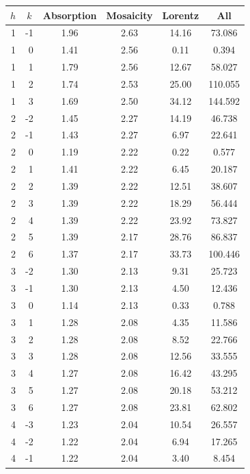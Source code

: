 \begin{table}[htbp]
  \centering
    \begin{tabular}{rrcccc}
    \hline
    \multicolumn{1}{c}{$h$} & \multicolumn{1}{c}{$k$} & \multicolumn{1}{c}{Absorption} & \multicolumn{1}{c}{Mosaicity} & \multicolumn{1}{c}{Lorentz} & \multicolumn{1}{c}{All} \\
    \hline    
    1  & -1 & 1.96 & 2.63 & 14.16 & 73.086  \\
    1  & 0  & 1.41 & 2.56 & 0.11  & 0.394   \\
    1  & 1  & 1.79 & 2.56 & 12.67 & 58.027  \\
    1  & 2  & 1.74 & 2.53 & 25.00 & 110.055 \\
    1  & 3  & 1.69 & 2.50 & 34.12 & 144.592 \\
    2  & -2 & 1.45 & 2.27 & 14.19 & 46.738  \\
    2  & -1 & 1.43 & 2.27 & 6.97  & 22.641  \\
    2  & 0  & 1.19 & 2.22 & 0.22  & 0.577   \\
    2  & 1  & 1.41 & 2.22 & 6.45  & 20.187  \\
    2  & 2  & 1.39 & 2.22 & 12.51 & 38.607  \\
    2  & 3  & 1.39 & 2.22 & 18.29 & 56.444  \\
    2  & 4  & 1.39 & 2.22 & 23.92 & 73.827  \\
    2  & 5  & 1.39 & 2.17 & 28.76 & 86.837  \\
    2  & 6  & 1.37 & 2.17 & 33.73 & 100.446 \\
    3  & -2 & 1.30 & 2.13 & 9.31  & 25.723  \\
    3  & -1 & 1.30 & 2.13 & 4.50  & 12.436  \\
    3  & 0  & 1.14 & 2.13 & 0.33  & 0.788   \\
    3  & 1  & 1.28 & 2.08 & 4.35  & 11.586  \\
    3  & 2  & 1.28 & 2.08 & 8.52  & 22.766  \\
    3  & 3  & 1.28 & 2.08 & 12.56 & 33.555  \\
    3  & 4  & 1.27 & 2.08 & 16.42 & 43.295  \\
    3  & 5  & 1.27 & 2.08 & 20.18 & 53.212  \\
    3  & 6  & 1.27 & 2.08 & 23.81 & 62.802  \\
    4  & -3 & 1.23 & 2.04 & 10.54 & 26.557  \\
    4  & -2 & 1.22 & 2.04 & 6.94  & 17.265  \\
    4  & -1 & 1.22 & 2.04 & 3.40  & 8.454   \\

\end{tabular}
\end{table}
